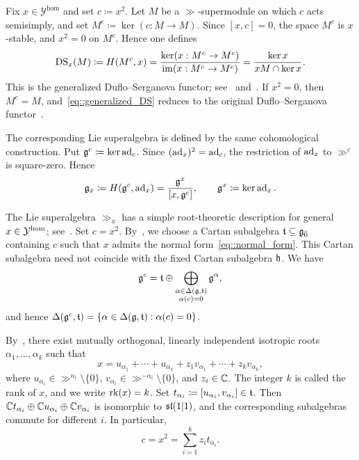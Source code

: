 Fix $x\in\mathcal{Y}^{\mathrm{hom}}$ and set $c\coloneqq x^{2}$. Let $M$ be a $\gg$-supermodule on which $c$ acts semisimply, and set $M^{c}\coloneqq \ker(c:M\to M)$. Since $[x,c]=0$, the space $M^{c}$ is $x$-stable, and $x^{2}=0$ on $M^{c}$. Hence one defines
\begin{equation}\label{eq::generalized_DS}
\DS_{x}(M)
\coloneqq 
H(M^{c},x)
=
\frac{\ker(x:M^{c}\to M^{c})}{\im(x:M^{c}\to M^{c})}
=
\frac{\ker x}{xM\cap\ker x}.
\end{equation}
This is the generalized Duflo--Serganova functor; see~\cite[Section~7.1]{GorelikSherman2024} and~\cite[Section~1]{Sherman2025}. If $x^{2}=0$, then $M^{c}=M$, and~\eqref{eq::generalized_DS} reduces to the original Duflo--Serganova functor~\cite{duflo2005associated}.

The corresponding Lie superalgebra is defined by the same cohomological construction. Put $\gg^{c}\coloneqq \ker\ad_{c}$. Since $(\ad_{x})^{2}=\ad_{c}$, the restriction of $\ad_{x}$ to $\gg^{c}$ is square-zero. Hence
\begin{equation}\label{eq::generalized_gx}
\gg_{x}\coloneqq H(\gg^{c},\ad_{x})
=\frac{\gg^{x}}{[x,\gg^{c}]},
\qquad
\gg^{x}\coloneqq \ker\ad_{x}.
\end{equation}

The Lie superalgebra $\gg_{x}$ has a simple root-theoretic description for general $x\in\YY^{\hom}$; see~\cite[Lemma~3.9 and Theorem~3.12]{Sherman2025}. Set $c=x^{2}$. 
By~\cite[Lemma~3.9]{Sherman2025}, we choose a Cartan subalgebra $\tt\subseteq\even$ containing $c$ such that $x$ admits the normal form~\eqref{eq::normal_form}. This Cartan subalgebra need not coincide with the fixed Cartan subalgebra $\hh$.
 We have
\begin{equation}
\gg^{c}
=
\tt\oplus
\bigoplus_{\substack{\alpha\in\Delta(\gg,\tt)\\ \alpha(c)=0}}
\gg^{\alpha},
\end{equation}
and hence $\Delta(\gg^{c},\tt)=\{\alpha\in\Delta(\gg,\tt):\alpha(c)=0\}$.

By~\cite[Lemma~3.9]{Sherman2025}, there exist mutually orthogonal, linearly independent isotropic roots $\alpha_{1},\ldots,\alpha_{k}$ such that
\begin{equation}\label{eq::normal_form}
x
=
u_{\alpha_{1}}+\cdots+u_{\alpha_{k}}
+
z_{1}v_{\alpha_{1}}+\cdots+z_{k}v_{\alpha_{k}},
\end{equation}
where $u_{\alpha_{i}}\in\gg^{\alpha_{i}}\setminus\{0\}$, $v_{\alpha_{i}}\in\gg^{-\alpha_{i}}\setminus\{0\}$, and $z_{i}\in\CC$. The integer $k$ is called the rank of $x$, and we write $\rk(x)=k$. Set $t_{\alpha_{i}}\coloneqq [u_{\alpha_{i}},v_{\alpha_{i}}]\in\tt$. Then $\CC t_{\alpha_{i}}\oplus\CC u_{\alpha_{i}}\oplus\CC v_{\alpha_{i}}$ is isomorphic to $\sl(1\vert1)$, and the corresponding subalgebras commute for different $i$. In particular,
\begin{equation}
c=x^{2}=\sum_{i=1}^{k}z_{i}t_{\alpha_{i}}.
\end{equation}

